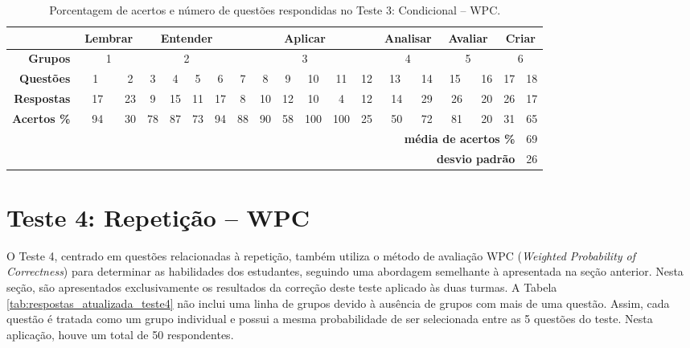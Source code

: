 \begin{table}[htbp]
    \centering
    \caption{Porcentagem de acertos e número de questões respondidas no Teste 3: Condicional -- WPC.}
    \label{tab:respostas_atualizada_teste3}
    \setlength{\tabcolsep}{4.2pt} %
    \begin{tabular}{|r|*{18}{c|}}
        \hline
        \multicolumn{1}{|l|}{} & \multicolumn{2}{c|}{\cellcolor{green!25}\textbf{Lembrar}} & \multicolumn{4}{c|}{\cellcolor{yellow!25}\textbf{Entender}} & \multicolumn{6}{|c|}{\cellcolor{red!25}\textbf{Aplicar}} & \multicolumn{2}{c|}{\cellcolor{blue!25}\textbf{Analisar}} & \multicolumn{2}{c|}{\cellcolor[HTML]{FFE599}\textbf{Avaliar}} & \multicolumn{2}{c|}{\cellcolor[HTML]{D5A6BD}\textbf{Criar}} \\ \hline
        \textbf{Grupos} & \multicolumn{2}{c|}{1} & \multicolumn{4}{c|}{2} & \multicolumn{6}{c|}{3} & \multicolumn{2}{c|}{4} & \multicolumn{2}{c|}{5} & \multicolumn{2}{c|}{6} \\\hline
        \rowcolor[HTML]{D9D9D9} 
        \textbf{Questões} & \ \ 1 \ \ & 2 & 3 & 4 & 5 & 6 & 7 & 8 & 9 & 10 & 11 & 12 & \ 13 \ & 14 & \ 15 \ & 16 & 17 & 18 \\
        \textbf{Respostas} & 17 & 23 & 9 & 15 & 11 & 17 & 8 & 10 & 12 & 10 & 4 & 12 & 14 & 29 & 26 & 20 & 26 & 17 \\ \rowcolor[HTML]{D9D9D9} 
        \textbf{Acertos \%} & 94 & 30 & 78 & 87 & 73 & 94 & 88 & 90 & 58 & 100 & 100 & 25 & 50 & 72 & 81 & 20 & 31 & 65 \\ \hline
        \multicolumn{13}{r}{} & \multicolumn{5}{r}{\cellcolor[HTML]{F9CB9C}\textbf{média de acertos \%}} & \multicolumn{1}{c}{\cellcolor[HTML]{F9CB9C}69} \\ 
        \multicolumn{13}{r}{} & \multicolumn{5}{r}{\cellcolor[HTML]{F9CB9C}\textbf{desvio padrão}} & \multicolumn{1}{c}{\cellcolor[HTML]{F9CB9C}26} \\ 
    \end{tabular}
\end{table}

\section{Teste 4: Repetição -- WPC}

O Teste 4, centrado em questões relacionadas à repetição, também utiliza o método de avaliação WPC (\textit{Weighted Probability of Correctness}) para determinar as habilidades dos estudantes, seguindo uma abordagem semelhante à apresentada na seção anterior. Nesta seção, são apresentados exclusivamente os resultados da correção deste teste aplicado às duas turmas. A Tabela \ref{tab:respostas_atualizada_teste4} não inclui uma linha de grupos devido à ausência de grupos com mais de uma questão. Assim, cada questão é tratada como um grupo individual e possui a mesma probabilidade de ser selecionada entre as 5 questões do teste. Nesta aplicação, houve um total de 50 respondentes.

